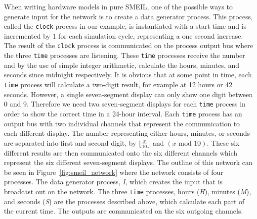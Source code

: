 When writing hardware models in pure SMEIL, one of the possible ways to generate input for the network is to create a data generator process. This process, called the \texttt{clock} process in our example, is instantiated with a start time and is incremented by 1 for each simulation cycle, representing a one second increase. The result of the \texttt{clock} process is communicated on the process output bus where the three \texttt{time} processes are listening. These \texttt{time} processes receive the number and by the use of simple integer arithmetic, calculate the hours, minutes, and seconds since midnight respectively. It is obvious that at some point in time, each \texttt{time} process will calculate a two-digit result, for example at 12 hours or 42 seconds. However, a single seven-segment display can only show one digit between 0 and 9. Therefore we need two seven-segment displays for each \texttt{time} process in order to show the correct time in a 24-hour interval. Each \texttt{time} process has an output bus with two individual channels that represent the communication to each different display. The number representing either hours, minutes, or seconds are separated into first and second digit, by $\lfloor \frac{x}{10} \rfloor$ and $(x \text{ mod } 10)$. These six different results are then communicated onto the six different channels which represent the six different seven-segment displays. The outline of this network can be seen in Figure~\ref{fig:smeil_network} where the network consists of four processes. The data generator process, \textit{I}, which creates the input that is broadcast out on the network. The three \texttt{time} processes, hours (\textit{H}), minutes (\textit{M}), and seconds (\textit{S}) are the processes described above, which calculate each part of the current time. The outputs are communicated on the six outgoing channels.
\\

